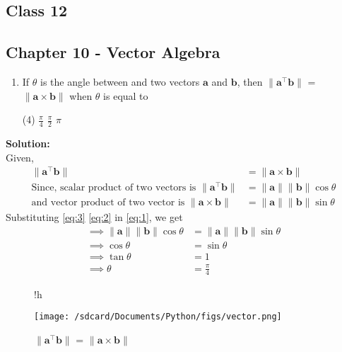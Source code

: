 \documentclass{article}
\newcommand{\norm}[1]{\lVert#1\rVert}
\renewcommand{\vec}[1]{\textbf{#1}}
\begin{document}
\onehalfspacing
\begin{center}
  \section*{\textbf{Class 12}}
  \subsection*{Chapter 10 - Vector Algebra}
\end{center}
\begin{enumerate}
	\item If $\theta$ is the angle between and two vectors $\vec{a}$ and $\vec{b}$, then $\norm{\vec{a}^{\top}\vec{b}}$ = $\norm{\vec{a}\times\vec{b}}$ when $\theta$ is equal to
    \begin{tasks}(4)
      \task $\frac{\pi}{4}$
      \task $\frac{\pi}{2}$
      \task $\pi$
      \end{tasks}
\end{enumerate}
  \textbf{Solution:}
  \\
Given,
\begin{align}
	\norm{\vec{a}^{\top}\vec{b}} &= \norm{\vec{a} \times \vec{b}} \label{eq:1}
  \\
	\text{Since, scalar product of two vectors is } \norm{\vec{a}^{\top}\vec{b}} &= \norm{\vec{a}}\norm{\vec{b}}\cos{\theta} \label{eq:2}
  \\
	\text{and vector product of two vector is }\norm{\vec{a} \times \vec{b}} &= \norm{\vec{a}}\norm{\vec{b}}\sin{\theta} \label{eq:3}
\end{align}
Substituting \eqref{eq:3} \eqref{eq:2} in \eqref{eq:1}, we get
\\
\begin{align}
	\implies \norm{\vec{a}}\norm{\vec{b}}\cos{\theta} &= \norm{\vec{a}}\norm{\vec{b}}\sin{\theta}\\
	\implies \cos{\theta} &= \sin{\theta}\\
	\implies \tan{\theta} &= 1\\
	\implies \theta &= \frac{\pi}{4}
\end{align}
\begin{figure}{!h}
	\begin{center}
		\texttt{[image: /sdcard/Documents/Python/figs/vector.png]}
	\end{center}
	\caption{$\norm{\vec{a}^{\top}\vec{b}}$ = $\norm{\vec{a}\times\vec{b}}$}
	\label{fig:12.10.5.19}
\end{figure}
\end{document}
